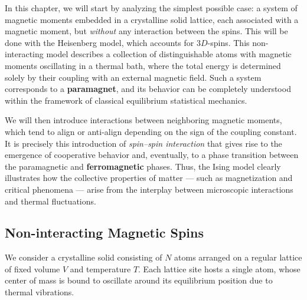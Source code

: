 In this chapter, we will start by analyzing the simplest possible case: a system of magnetic moments embedded in a crystalline solid lattice, each associated with a magnetic moment, but \textit{without} any interaction between the spins. This will be done with the Heisenberg model, which accounts for \(3D\)-spins.
This non-interacting model describes a collection of distinguishable atoms with magnetic moments oscillating in a thermal bath, where the total energy is determined solely by their coupling with an external magnetic field.
Such a system corresponds to a \textbf{paramagnet}, and its behavior can be completely understood within the framework of classical equilibrium statistical mechanics.

We will then introduce interactions between neighboring magnetic moments, which tend to align or anti-align depending on the sign of the coupling constant.
It is precisely this introduction of \textit{spin--spin interaction} that gives rise to the emergence of cooperative behavior and, eventually, to a phase transition between the paramagnetic and \textbf{ferromagnetic} phases.
Thus, the Ising model clearly illustrates how the collective properties of matter — such as magnetization and critical phenomena — arise from the interplay between microscopic interactions and thermal fluctuations.

\subsection{Non-interacting Magnetic Spins}

We consider a crystalline solid consisting of \(N\) atoms arranged on a regular lattice of fixed volume \(V\) and temperature \(T\).
Each lattice site hosts a single atom, whose center of mass is bound to oscillate around its equilibrium position due to thermal vibrations.

